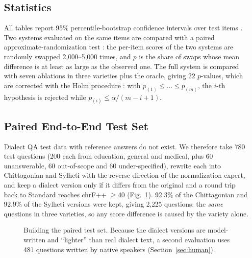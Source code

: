 \subsection{Statistics}
All tables report 95\% percentile-bootstrap confidence intervals over test items \cite{efron1993bootstrap,koehn2004bootstrap}. Two systems evaluated on the same items are compared with a paired approximate-randomization test \cite{riezler2005randomization}: the per-item scores of the two systems are randomly swapped 2,000--5,000 times, and $p$ is the share of swaps whose mean difference is at least as large as the observed one. The full system is compared with seven ablations in three varieties plus the oracle, giving 22 $p$-values, which are corrected with the Holm procedure \cite{holm1979}: with $p_{(1)}\le\dots\le p_{(m)}$, the $i$-th hypothesis is rejected while $p_{(i)}\le\alpha/(m-i+1)$.

\subsection{Paired End-to-End Test Set}
\label{sec:paired}
Dialect QA test data with reference answers do not exist. We therefore take 780 test questions (200 each from education, general and medical, plus 60 unanswerable, 60 out-of-scope and 60 under-specified), rewrite each into Chittagonian and Sylheti with the reverse direction of the normalization expert, and keep a dialect version only if it differs from the original and a round trip back to Standard reaches chrF++ $\ge 40$ (Fig.~\ref{fig:paired}). 92.3\% of the Chittagonian and 92.9\% of the Sylheti versions were kept, giving 2,225 questions: the \emph{same} questions in three varieties, so any score difference is caused by the variety alone.

\begin{figure}[!t]
\centering
{}
\caption{Building the paired test set. Because the dialect versions are model-written and ``lighter'' than real dialect text, a second evaluation uses 481 questions written by native speakers (Section~\ref{sec:human}).}
\label{fig:paired}
\end{figure}

